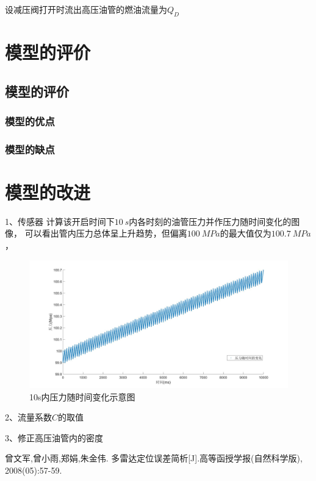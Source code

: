 \documentclass[withoutpreface,bwprint]{cumcmthesis} %
\begin{document}
    设减压阀打开时流出高压油管的燃油流量为$Q_D$



\section{模型的评价}
\subsection{模型的评价}
\subsubsection{模型的优点}

\subsubsection{模型的缺点}

\section{模型的改进}
1、传感器
    计算该开启时间下$10~s$内各时刻的油管压力并作压力随时间变化的图像，
    可以看出管内压力总体呈上升趋势，但偏离$100~MPa$的最大值仅为$100.7~MPa$，

    \begin{figure}[!h]
    \centering
    \includegraphics[width=.95\textwidth]{100Mpa10secs.jpg}
    \caption{10s内压力随时间变化示意图}
    \label{figure3.5}
    \end{figure}


2、流量系数$C$的取值

3、修正高压油管内的密度
   

\begin{thebibliography}{9}%
曾文军,曾小雨,郑娟,朱金伟.
    多雷达定位误差简析[J].高等函授学报(自然科学版),
    2008(05):57-59.

\end{thebibliography}
\end{document}
